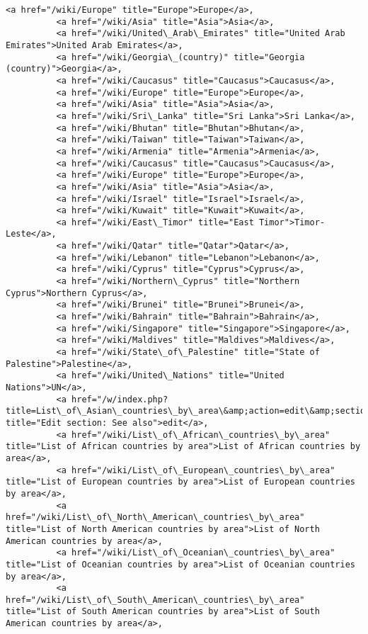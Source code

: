 \documentclass[11pt]{article}
\begin{document}
\begin{Verbatim}[commandchars=\\\{\}]
          <a href="/wiki/Europe" title="Europe">Europe</a>,
          <a href="/wiki/Asia" title="Asia">Asia</a>,
          <a href="/wiki/United\_Arab\_Emirates" title="United Arab Emirates">United Arab Emirates</a>,
          <a href="/wiki/Georgia\_(country)" title="Georgia (country)">Georgia</a>,
          <a href="/wiki/Caucasus" title="Caucasus">Caucasus</a>,
          <a href="/wiki/Europe" title="Europe">Europe</a>,
          <a href="/wiki/Asia" title="Asia">Asia</a>,
          <a href="/wiki/Sri\_Lanka" title="Sri Lanka">Sri Lanka</a>,
          <a href="/wiki/Bhutan" title="Bhutan">Bhutan</a>,
          <a href="/wiki/Taiwan" title="Taiwan">Taiwan</a>,
          <a href="/wiki/Armenia" title="Armenia">Armenia</a>,
          <a href="/wiki/Caucasus" title="Caucasus">Caucasus</a>,
          <a href="/wiki/Europe" title="Europe">Europe</a>,
          <a href="/wiki/Asia" title="Asia">Asia</a>,
          <a href="/wiki/Israel" title="Israel">Israel</a>,
          <a href="/wiki/Kuwait" title="Kuwait">Kuwait</a>,
          <a href="/wiki/East\_Timor" title="East Timor">Timor-Leste</a>,
          <a href="/wiki/Qatar" title="Qatar">Qatar</a>,
          <a href="/wiki/Lebanon" title="Lebanon">Lebanon</a>,
          <a href="/wiki/Cyprus" title="Cyprus">Cyprus</a>,
          <a href="/wiki/Northern\_Cyprus" title="Northern Cyprus">Northern Cyprus</a>,
          <a href="/wiki/Brunei" title="Brunei">Brunei</a>,
          <a href="/wiki/Bahrain" title="Bahrain">Bahrain</a>,
          <a href="/wiki/Singapore" title="Singapore">Singapore</a>,
          <a href="/wiki/Maldives" title="Maldives">Maldives</a>,
          <a href="/wiki/State\_of\_Palestine" title="State of Palestine">Palestine</a>,
          <a href="/wiki/United\_Nations" title="United Nations">UN</a>,
          <a href="/w/index.php?title=List\_of\_Asian\_countries\_by\_area\&amp;action=edit\&amp;section=1" title="Edit section: See also">edit</a>,
          <a href="/wiki/List\_of\_African\_countries\_by\_area" title="List of African countries by area">List of African countries by area</a>,
          <a href="/wiki/List\_of\_European\_countries\_by\_area" title="List of European countries by area">List of European countries by area</a>,
          <a href="/wiki/List\_of\_North\_American\_countries\_by\_area" title="List of North American countries by area">List of North American countries by area</a>,
          <a href="/wiki/List\_of\_Oceanian\_countries\_by\_area" title="List of Oceanian countries by area">List of Oceanian countries by area</a>,
          <a href="/wiki/List\_of\_South\_American\_countries\_by\_area" title="List of South American countries by area">List of South American countries by area</a>,

\end{Verbatim}
\end{document}
